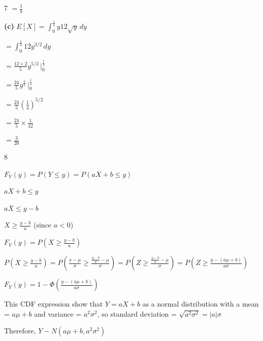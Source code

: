 \documentclass[12 pt]{article}
\begin{document}
\begin{exercise}{7}
    $= \frac{1}{8}$

    \hfill

    \textbf{(c)} $E[X] = \int_{0}^{\frac{1}{4}} y 12 \sqrt{y} \, dy$

    $= \int_{0}^{\frac{1}{4}} 12 y^{3/2} \, dy$

    $= \frac{12 \times 2}{5} y^{5/2} \, |_{0}^{\frac{1}{4}}$

    $= \frac{24}{5} y^{\frac{5}{2}} \, |_{0}^{\frac{1}{4}}$

    $= \frac{24}{5} (\frac{1}{4})^{5/2}$

    $= \frac{24}{5} \times \frac{1}{32}$

    $= \frac{3}{20}$

    \hfill
    \end{exercise}



    \begin{exercise}{8}
    \hfill

    $F_Y(y) = P(Y \leq y) = P(aX+b \leq y)$

    $aX + b \leq y$

    $aX \leq y -b$

    $X \geq \frac{y-b}{a}$ (since $a<0$)

    $F_Y(y) = P(X \geq \frac{y-b}{a})$

    $P(X \geq \frac{y-b}{a}) = P(\frac{x- \mu}{\sigma} \geq \frac{\frac{y-b}{a} - \mu}{\sigma}) = P(Z \geq \frac{\frac{y-b}{a}- \mu}{\sigma}) = P(Z \geq \frac{y - (a \mu +b)}{a \sigma})$

    $F_Y(y) = 1 - \Phi (\frac{y - (a \mu +b)}{a \sigma})$

    This CDF expression show that $Y = aX+b$ as a normal distribution with a mean = $a \mu + b$ and variance = $a^2 {\sigma}^2$, so standard deviation = $\sqrt{a^2{\sigma}^2} = |a| \sigma$

    Therefore, $Y - N(a \mu +b, a^2{\sigma}^2)$

    \hfill
    \end{exercise}
\end{document}
